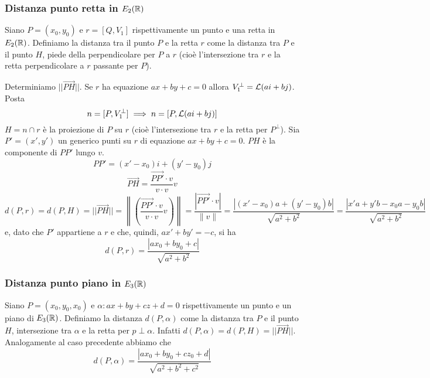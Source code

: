 \subsubsection{Distanza punto retta in \(E_2(\RR )\)}
Siano \(P = (x_0, y_0)\) e \(r = [Q, V_1]\) rispettivamente un punto e una retta in \(E_{2}(\RR)\). Definiamo la distanza tra il punto \(P\) e la retta \(r\) come la distanza tra \(P\) e il punto \(H\), piede della perpendicolare per \(P\) a \(r\) (cioè l'intersezione tra \(r\) e la retta perpendicolare a \(r\) passante per \(P\)). 
\begin{center}
\end{center}
Determiniamo \(||\vec{{PH}}||\). Se \(r\) ha equazione \(ax + by +c = 0\) allora \(V_1^{\perp} = \mathcal{L}(a i + b j)  \). Posta \[n = [P, V_1^{\perp}] \implies n = [P, \mathcal{L}(a i + bj) ]\]
\(H = n \cap r \) è la proiezione di \(P\) su \(r\) (cioè l'intersezione tra \(r\) e la retta per \(P^{\perp} \)). Sia \(P' = (x', y')\) un generico punti su \(r\) di equazione \(ax + by + c = 0\). \(PH\) è la componente di \(PP'\) lungo \(v\). \[PP' = (x'-x_0) i + (y' - y_0)j\]\[
    \vec{{PH}} = \frac{\vec{PP'} \cdot v}{ v \cdot v } v
\] \[
d(P,r) = d (P, H) = || \vec{{PH}} || = \left\| \left( \frac{\vec{{PP'}} \cdot v}{v \cdot v} v \right)  \right\| = \frac{|\vec{PP'} \cdot v| }{\|v\|} = \frac{|(x'-x_0) a + (y' - y_0) b| }{\sqrt{a^2 + b ^2} } = \frac{|x'a + y'b - x_0a - y_0b| }{\sqrt{a^2 + b ^2} }
\] e, dato che \(P'\) appartiene a \(r\) e che, quindi, \(ax' + by' = -c\), si ha \[
d(P, r) = \frac{|ax_0 + by_0 + c|}{\sqrt{a^{2} + b^{2} }}
\] 
\subsubsection{Distanza punto piano in \(E_3(\RR )\)}
Siano \(P = (x_0, y_0, x_0)\) e \(\alpha : ax + by + cz + d = 0\) rispettivamente un punto e un piano di \(E_{3}(\RR)\). Definiamo la distanza \(d(P, \alpha)\) come la distanza tra \(P\) e il punto \(H\), intersezione tra \(\alpha\) e la retta per \(p \perp \alpha \). Infatti \(d(P, \alpha )= d (P, H) = ||\vec{{PH}}||\). Analogamente al caso precedente abbiamo che \[
    d(P, \alpha ) = \frac{|ax_0 + by_0 + cz_0 + d|}{\sqrt{a^{2} + b^{2} + c^{2} }}
\]

